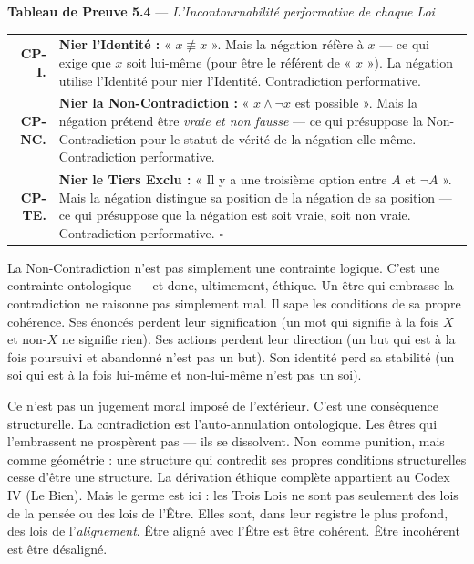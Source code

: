 \documentclass[10pt, openany, oneside]{book}
\renewcommand{\footnotesize}{\fontsize{8.5}{11}\selectfont}
\begin{document}
\textbf{Tableau de Preuve 5.4} --- \textit{L'Incontournabilité performative de chaque Loi}

\vspace{0.5em}

{\footnotesize
\noindent\begin{tabular}{r p{}}
\textbf{CP-I.} & \textbf{Nier l'Identité :} « $x \not\equiv x$ ». Mais la négation réfère à $x$ --- ce qui exige que $x$ soit lui-même (pour être le référent de « $x$ »). La négation utilise l'Identité pour nier l'Identité. Contradiction performative. \\[0.3em]
\textbf{CP-NC.} & \textbf{Nier la Non-Contradiction :} « $x \wedge \neg x$ est possible ». Mais la négation prétend être \textit{vraie et non fausse} --- ce qui présuppose la Non-Contradiction pour le statut de vérité de la négation elle-même. Contradiction performative. \\[0.3em]
\textbf{CP-TE.} & \textbf{Nier le Tiers Exclu :} « Il y a une troisième option entre $A$ et $\neg A$ ». Mais la négation distingue sa position de la négation de sa position --- ce qui présuppose que la négation est soit vraie, soit non vraie. Contradiction performative. $\square$ \\[0.3em]
\end{tabular}
}

\vspace{0.8em}

\noindent La Non-Contradiction n'est pas simplement une contrainte logique. C'est une contrainte ontologique --- et donc, ultimement, éthique. Un être qui embrasse la contradiction ne raisonne pas simplement mal. Il sape les conditions de sa propre cohérence. Ses énoncés perdent leur signification (un mot qui signifie à la fois $X$ et non-$X$ ne signifie rien). Ses actions perdent leur direction (un but qui est à la fois poursuivi et abandonné n'est pas un but). Son identité perd sa stabilité (un soi qui est à la fois lui-même et non-lui-même n'est pas un soi).

Ce n'est pas un jugement moral imposé de l'extérieur. C'est une conséquence structurelle. La contradiction est l'auto-annulation ontologique. Les êtres qui l'embrassent ne prospèrent pas --- ils se dissolvent. Non comme punition, mais comme géométrie : une structure qui contredit ses propres conditions structurelles cesse d'être une structure. La dérivation éthique complète appartient au Codex IV (Le Bien). Mais le germe est ici : les Trois Lois ne sont pas seulement des lois de la pensée ou des lois de l'Être. Elles sont, dans leur registre le plus profond, des lois de l'\textit{alignement}. Être aligné avec l'Être est être cohérent. Être incohérent est être désaligné.
\end{document}
